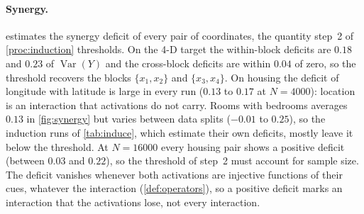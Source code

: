 \documentclass[11pt]{article}
\theoremstyle{definition}
\theoremstyle{remark}
\newcommand{\Var}{\operatorname{Var}}
\begin{document}
\paragraph{Synergy.}
 estimates the synergy deficit of every pair of coordinates, the
quantity step~2 of \cref{proc:induction} thresholds.  On the 4-D target the within-block
deficits are $0.18$ and $0.23$ of $\Var(Y)$ and the cross-block deficits are within
$0.04$ of zero, so the threshold recovers the blocks $\{x_1,x_2\}$ and $\{x_3,x_4\}$.  On
housing the deficit of longitude with latitude is large in every run ($0.13$ to $0.17$ at
$N=4000$): location is an interaction that activations do not carry.  Rooms with bedrooms
averages $0.13$ in \cref{fig:synergy} but varies between data splits ($-0.01$ to $0.25$), so
the induction runs of \cref{tab:induce}, which estimate their own deficits, mostly leave
it below the threshold.  At $N=16000$ every housing pair shows a positive deficit (between $0.03$ and
$0.22$), so the threshold of step~2 must account for sample size.  The deficit vanishes
whenever both activations are injective functions of their cues, whatever the
interaction (\cref{def:operators}), so a positive deficit marks an interaction that the
activations lose, not every interaction.

\begin{table}[t]
\centering\small
\resizebox{\linewidth}{!}{}
\caption{Task induction end to end (\cref{proc:induction}; three seeds, $\kappa=0.25$ for
every candidate, so the single-tree errors differ from those of \cref{tab:toys,tab:feynman},
which tune $\kappa$).  Groups formed by step~2 at threshold $\tau=0.05$ (most frequent
over seeds, each run estimating its own deficits) and test RMSE$/\mathrm{sd}$ of the
single tree, of the generic balanced forest over the inputs, of the forest selected on
validation data among the single tree, the balanced forest and the induced forests for
$\tau\in\{0.02,0.05,0.1,0.2\}$ with activation or hybrid messages, and of the best
candidate in hindsight.}
\label{tab:induce}
\end{table}
\end{document}
